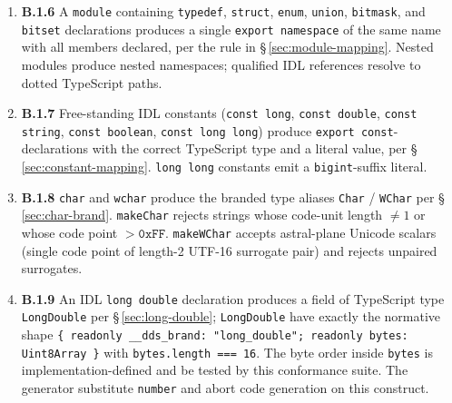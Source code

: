 \documentclass{../styles/zerodds-vendor-spec}
\begin{document}
\begin{enumerate}
        unsigned 32-bit shift expressions
        (\texttt{(1\,\texttt{<<}\,K)\,\texttt{>>>}\,0}) and a
        \texttt{number} alias; with \texttt{@bit\_bound} in
        $33..64$ produces \texttt{1n\,\texttt{<<}\,Kn} expressions
        and a \texttt{bigint} alias; \texttt{@position(P)}
        annotations override implicit positions; a descriptor with
        \texttt{kind:\,"bitmask"} is emitted per
        \S\,\ref{sec:bitmask-descriptor}.
  \item \textbf{B.1.6} A \texttt{module} containing
        \texttt{typedef}, \texttt{struct}, \texttt{enum},
        \texttt{union}, \texttt{bitmask}, and \texttt{bitset}
        declarations produces a single \texttt{export namespace}
        of the same name with all members declared, per the rule
        in \S\,\ref{sec:module-mapping}. Nested modules produce
        nested namespaces; qualified IDL references resolve to
        dotted TypeScript paths.
  \item \textbf{B.1.7} Free-standing IDL constants
        (\texttt{const long}, \texttt{const double},
        \texttt{const string}, \texttt{const boolean},
        \texttt{const long long}) produce
        \texttt{export const}-declarations with the correct
        TypeScript type and a literal value, per
        \S\,\ref{sec:constant-mapping}. \texttt{long long}
        constants emit a \texttt{bigint}-suffix literal.
  \item \textbf{B.1.8} \texttt{char} and \texttt{wchar} produce
        the branded type aliases \texttt{Char} / \texttt{WChar}
        per \S\,\ref{sec:char-brand}. \texttt{makeChar} rejects
        strings whose code-unit length $\neq 1$ or whose code
        point $> \mathtt{0xFF}$. \texttt{makeWChar} accepts
        astral-plane Unicode scalars (single code point of
        length-2 UTF-16 surrogate pair) and rejects unpaired
        surrogates.
  \item \textbf{B.1.9} An IDL \texttt{long double} declaration
        produces a field of TypeScript type \texttt{LongDouble}
        per \S\,\ref{sec:long-double}; \texttt{LongDouble}
         have exactly the normative shape
        \texttt{\{ readonly \_\_dds\_brand:\,"long\_double";
        readonly bytes:\,Uint8Array \}} with
        \texttt{bytes.length === 16}. The byte order inside
        \texttt{bytes} is implementation-defined and  be tested by this conformance suite. The generator
         substitute \texttt{number} and
         abort code generation on this construct.

\end{enumerate}
\end{document}
